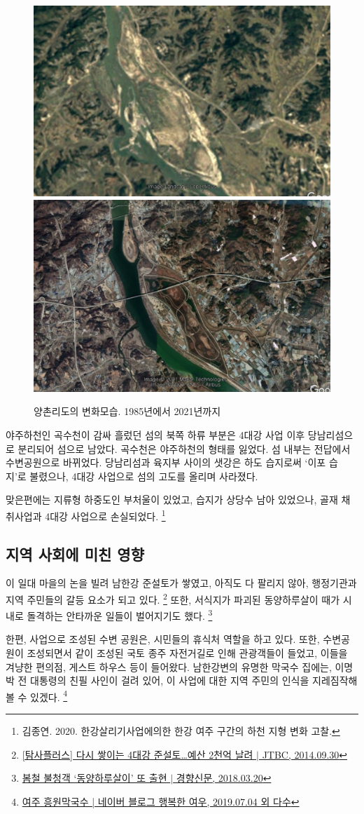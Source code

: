 \begin{figure}[ht]
    \centering
    \includegraphics[width=.45\textwidth]{img/양촌리 1985.jpg}
    \includegraphics[width=.45\textwidth]{img/양촌리 2021.jpg}
    \caption{양촌리도의 변화모습. 1985년에서 2021년까지 }
    \label{fig:my_labe613}
\end{figure}


야주하천인 곡수천이 감싸 흘렀던 섬의 북쪽 하류 부분은 4대강 사업 이후 당남리섬으로 분리되어 섬으로 남았다. 
곡수천은 야주하천의 형태를 잃었다. 섬 내부는 전답에서 수변공원으로 바뀌었다.
당남리섬과 육지부 사이의 샛강은 하도 습지로써 `이포 습지'로 불렸으나, 4대강 사업으로 섬의 고도를 올리며 사라졌다.

맞은편에는 지류형 하중도인 부처울이 있었고, 습지가 상당수 남아 있었으나, 골재 채취사업과 4대강 사업으로 손실되었다.
\footnote{김종연. 2020. 한강살리기사업에의한 한강 여주 구간의 하천 지형 변화 고찰.}

\subsection{지역 사회에 미친 영향}
이 일대 마을의 논을 빌려 남한강 준설토가 쌓였고,
아직도 다 팔리지 않아, 행정기관과 지역 주민들의 갈등 요소가 되고 있다.
\footnote{\href{https://news.jtbc.joins.com/article/article.aspx?news_id=NB10593178}{[탐사플러스] 다시 쌓이는 4대강 준설토…예산 2천억 날려 $|$ JTBC, 2014.09.30}}
또한, 서식지가 파괴된 동양하루살이 때가 시내로 돌격하는 안타까운 일들이 벌어지기도 했다.
\footnote{\href{http://news.khan.co.kr/kh_news/khan_art_view.html?artid=201803201448001&code=620109}{봄철 불청객 `동양하루살이' 또 출현 $|$ 경향신문, 2018.03.20}}

한편, 사업으로 조성된 수변 공원은, 시민들의 휴식처 역할을 하고 있다.
또한, 수변공원이 조성되면서 같이 조성된 국토 종주 자전거길로 인해 관광객들이 들었고,
이들을 겨냥한 편의점, 게스트 하우스 등이 들어왔다.
남한강변의 유명한 막국수 집에는, 이명박 전 대통령의 친필 사인이 걸려 있어,
이 사업에 대한 지역 주민의 인식을 지레짐작해 볼 수 있겠다.
\footnote{\href{https://blog.naver.com/lovelyiii/221577715597}{여주 흥원막국수 | 네이버 블로그 행복한 여우, 2019.07.04 외 다수}}

